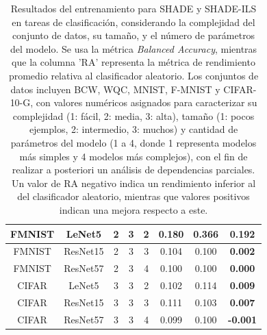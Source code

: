 \begin{table}[]
{\begin{tabular}{|c|c|c|c|c|c|c|c|}
FMNIST                     & LeNet5          & 2                    & 3               & 2                   & 0.180          & 0.366              & \textbf{0.192}  \\ \hline
FMNIST                     & ResNet15        & 2                    & 3               & 3                   & 0.104          & 0.100              & \textbf{0.002}  \\ \hline
FMNIST                     & ResNet57        & 2                    & 3               & 4                   & 0.100          & 0.100              & \textbf{0.000}  \\ \hline
CIFAR                      & LeNet5          & 3                    & 3               & 2                   & 0.102          & 0.114              & \textbf{0.009}  \\ \hline
CIFAR                      & ResNet15        & 3                    & 3               & 3                   & 0.111          & 0.103              & \textbf{0.007}  \\ \hline
CIFAR                      & ResNet57        & 3                    & 3               & 4                   & 0.099          & 0.100              & \textbf{-0.001} \\ \hline
\end{tabular}}
\caption[Resultados del entrenamiento para SHADE y SHADE-ILS en tareas de clasificación, considerando la complejidad del conjunto de datos, su tamaño, y el número de parámetros del modelo]{Resultados del entrenamiento para SHADE y SHADE-ILS en tareas de clasificación, considerando la complejidad del conjunto de datos, su tamaño, y el número de parámetros del modelo. Se usa la métrica \textit{Balanced Accuracy}, mientras que la columna 'RA' representa la métrica de rendimiento promedio relativa al clasificador aleatorio. Los conjuntos de datos incluyen BCW, WQC, MNIST, F-MNIST y CIFAR-10-G, con valores numéricos asignados para caracterizar su complejidad (1: fácil, 2: media, 3: alta), tamaño (1: pocos ejemplos, 2: intermedio, 3: muchos) y cantidad de parámetros del modelo (1 a 4, donde 1 representa modelos más simples y 4 modelos más complejos), con el fin de realizar a posteriori un análisis de dependencias parciales. Un valor de RA negativo indica un rendimiento inferior al del clasificador aleatorio, mientras que valores positivos indican una mejora respecto a este.}
\label{tab:esc1}
\end{table}


